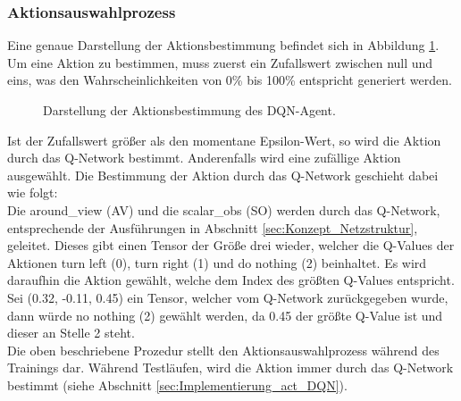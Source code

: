 \subsubsection{Aktionsauswahlprozess} \label{sec:Konzept_Aktionsauswahlprozess_DQN}
Eine genaue Darstellung der Aktionsbestimmung befindet sich in Abbildung \ref{fig:DQN-Aktionsbestimmung}. Um eine Aktion zu bestimmen, muss zuerst ein Zufallswert zwischen null und eins, was den Wahrscheinlichkeiten von 0\% bis 100\% entspricht generiert werden.
\begin{figure}[H]
	\centering
	\def\svgscale{0.13}
	
	\caption[DQN-Aktionsbestimmung]{Darstellung der Aktionsbestimmung des DQN-Agent.}
	\label{fig:DQN-Aktionsbestimmung}
\end{figure}
Ist der Zufallswert größer als den momentane Epsilon-Wert, so wird die Aktion durch das Q-Network bestimmt. Anderenfalls wird eine zufällige Aktion ausgewählt. Die Bestimmung der Aktion durch das Q-Network geschieht dabei wie folgt:\\
Die around\_view (AV) und die scalar\_obs (SO) werden durch das Q-Network, entsprechende der Ausführungen in Abschnitt \ref{sec:Konzept_Netzstruktur}, geleitet. Dieses gibt einen Tensor der Größe drei wieder, welcher die Q-Values der Aktionen turn left (0), turn right (1) und do nothing (2) beinhaltet.
Es wird daraufhin die Aktion gewählt, welche dem Index des größten Q-Values entspricht.\\
Sei (0.32, -0.11, 0.45) ein Tensor, welcher vom Q-Network zurückgegeben wurde, dann würde no nothing (2) gewählt werden, da 0.45 der größte Q-Value ist und dieser an Stelle 2 steht.\\
Die oben beschriebene Prozedur stellt den Aktionsauswahlprozess während des Trainings dar. Während Testläufen, wird die Aktion immer durch das Q-Network bestimmt (siehe Abschnitt \ref{sec:Implementierung_act_DQN}).

